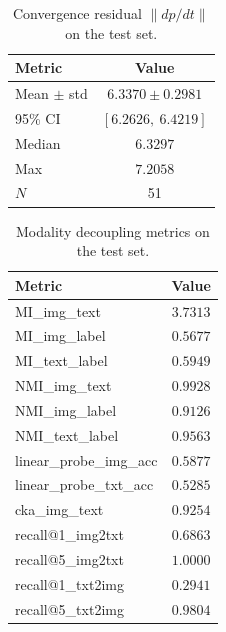 \begin{table}[h]\centering
\caption{Convergence residual $\|dp/dt\|$ on the test set.}
\begin{tabular}{lc}\hline
Metric & Value \\ \hline
Mean $\pm$ std & $6.3370 \pm 0.2981$ \\
95\% CI & $[6.2626,\ 6.4219]$ \\
Median & $6.3297$ \\
Max & $7.2058$ \\
$N$ & 51 \\
\hline\end{tabular}\end{table}

\begin{table}[h]\centering
\caption{Modality decoupling metrics on the test set.}
\begin{tabular}{lc}\hline
Metric & Value \\ \hline
MI_img_text & $3.7313$ \\
MI_img_label & $0.5677$ \\
MI_text_label & $0.5949$ \\
NMI_img_text & $0.9928$ \\
NMI_img_label & $0.9126$ \\
NMI_text_label & $0.9563$ \\
linear_probe_img_acc & $0.5877$ \\
linear_probe_txt_acc & $0.5285$ \\
cka_img_text & $0.9254$ \\
recall@1_img2txt & $0.6863$ \\
recall@5_img2txt & $1.0000$ \\
recall@1_txt2img & $0.2941$ \\
recall@5_txt2img & $0.9804$ \\
\hline\end{tabular}\end{table}